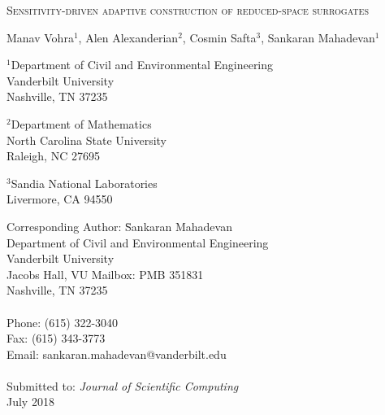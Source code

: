 \begin{center}
\textsc{
Sensitivity-driven adaptive construction of reduced-space surrogates
}

\bigskip 
\bigskip 

Manav Vohra$^{1}$, Alen Alexanderian$^{2}$, Cosmin Safta$^{3}$, Sankaran Mahadevan$^{1}$

\bigskip
\bigskip

\normalsize
$^1$Department of Civil and Environmental Engineering\\
Vanderbilt University\\
Nashville, TN 37235\\

\bigskip

$^2$Department of Mathematics\\
North Carolina State University\\
Raleigh, NC 27695\\

\bigskip

$^3$Sandia National Laboratories\\
Livermore, CA 94550\\

\end{center}

\vspace{6cm}

\begin{tabbing}
Corresponding Author: \hspace{5mm} \= Sankaran Mahadevan\\
       \>  Department of Civil and Environmental Engineering\\
       \>  Vanderbilt University\\
        Jacobs Hall, VU Mailbox: PMB 351831 \\
       \>  Nashville, TN 37235 \\
       \> \\
Phone: \> (615) 322-3040 \\
Fax:   \> (615) 343-3773 \\
Email: \>  sankaran.mahadevan@vanderbilt.edu   \\
\\
Submitted to: \> \textit{Journal of Scientific Computing} \\
\>  July 2018\\

\bigskip
\end{tabbing}

\clearpage

